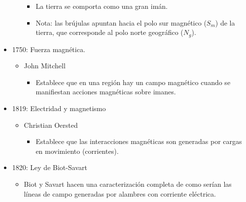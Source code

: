 \documentclass[a4paper,10pt]{article}
\begin{document}
\begin{itemize}
\begin{itemize}
\begin{itemize}
        \item La tierra se comporta como una gran imán.
    
        \item Nota: las brújulas apuntan hacia el polo sur magnético ($S_m$)
        de la tierra, que corresponde al polo norte geográfico ($N_g$).

        \end{itemize}

    \end{itemize}

\item 1750: Fuerza magnética.

    \begin{itemize}
    
    \item John Mitchell
    
        \begin{itemize}
        
        \item Establece que en una región hay un campo magnético cuando se manifiestan acciones
        magnéticas sobre imanes.
    
        \end{itemize}

    \end{itemize}

\item 1819: Electridad y magnetismo

    \begin{itemize}    
    
    \item Christian Oersted
    
        \begin{itemize}
            
        \item Establece que las interacciones magnéticas son generadas por cargas en movimiento
        (corrientes).
        
        \end{itemize}
            
    \end{itemize}

\item 1820: Ley de Biot-Savart

    \begin{itemize}

    \item Biot y Savart hacen una caracterización completa de como serían las líneas de campo
    generadas por alambres con corriente eléctrica.   
    

\end{itemize}
\end{itemize}
\end{document}
